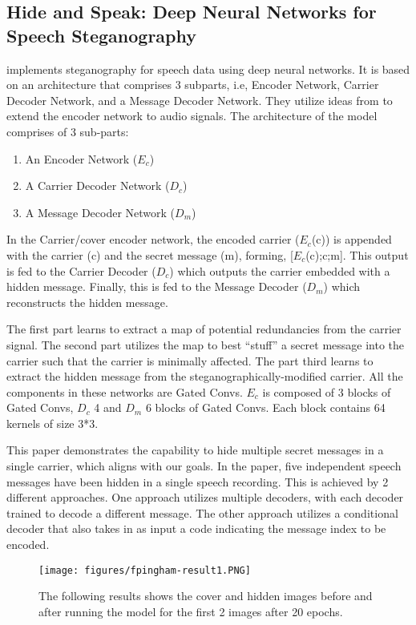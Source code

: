 \documentclass{article}
\begin{document}
\subsection{Hide and Speak: Deep Neural Networks for Speech Steganography}

\cite{kreuk2019hide} implements steganography for speech data using deep neural networks. It is based on an architecture that comprises 3 subparts, i.e, Encoder Network, Carrier Decoder Network, and a Message Decoder Network. They utilize ideas from \cite{DBLP:journals/corr/abs-1807-09937} to extend the encoder network to audio signals. The architecture of the model comprises of 3 sub-parts:
    \begin{enumerate}{}
        \itemsep0em 
        \item An Encoder Network ($E_c$)
        \item A Carrier Decoder Network ($D_c$)
        \item A Message Decoder Network ($D_m$)
    \end{enumerate}


In the Carrier/cover encoder network, the encoded carrier ($E_c$(c)) is appended with the carrier (c) and the secret message (m), forming, [$E_c$(c);c;m]. This output is fed to the Carrier Decoder ($D_c$) which outputs the carrier embedded with a hidden message. Finally, this is fed to the Message Decoder ($D_m$) which reconstructs the hidden message.


The first part learns to extract a map of potential redundancies from the carrier signal. The second part utilizes the map to best “stuff” a secret message into the carrier such that the carrier is minimally affected. The part third learns to extract the hidden message from the steganographically-modified carrier. All the components in these networks are Gated Convs. $E_c$ is composed of 3 blocks of Gated Convs, $D_c$ 4 and $D_m$ 6 blocks of Gated Convs. Each block contains 64 kernels of size 3*3.

This paper demonstrates the capability to hide multiple secret messages in a single carrier, which aligns with our goals. In the paper, five independent speech messages have been hidden in a single speech recording. This is achieved by 2 different approaches. One approach utilizes multiple decoders, with each decoder trained to decode a different message. The other approach utilizes a conditional decoder that also takes in as input a code indicating the message index to be encoded. 

\begin{figure*}[t]
\vskip 0.2in
\begin{center}
\centerline{\texttt{[image: figures/fpingham-result1.PNG]}}
\caption{The following results shows the cover and hidden images before and after running the model for the first 2 images after 20 epochs.}
\label{fig:fpingham_res1}
\end{center}
\vskip -0.4in
\end{figure*}
\end{document}
